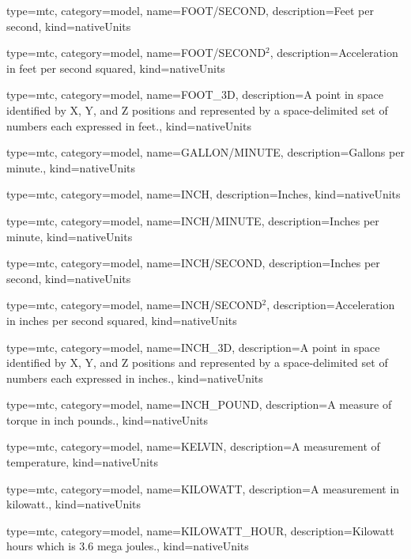 {
  type=mtc,
  category=model,
  name={FOOT/SECOND},
  description={Feet per second},
  kind={nativeUnits}
}


{
  type=mtc,
  category=model,
  name={FOOT/SECOND$^2$},
  description={Acceleration in feet per second squared},
  kind={nativeUnits}
}


{
  type=mtc,
  category=model,
  name={FOOT\_3D},
  description={A point in space identified by X, Y, and Z positions and represented by a space-delimited set of numbers each expressed in feet.},
  kind={nativeUnits}
}


{
  type=mtc,
  category=model,
  name={GALLON/MINUTE},
  description={Gallons per minute.},
  kind={nativeUnits}
}


{
  type=mtc,
  category=model,
  name={INCH},
  description={Inches},
  kind={nativeUnits}
}


{
  type=mtc,
  category=model,
  name={INCH/MINUTE},
  description={Inches per minute},
  kind={nativeUnits}
}


{
  type=mtc,
  category=model,
  name={INCH/SECOND},
  description={Inches per second},
  kind={nativeUnits}
}


{
  type=mtc,
  category=model,
  name={INCH/SECOND$^2$},
  description={Acceleration in inches per second squared},
  kind={nativeUnits}
}


{
  type=mtc,
  category=model,
  name={INCH\_3D},
  description={A point in space identified by X, Y, and Z positions and represented by a space-delimited set of numbers each expressed in inches.},
  kind={nativeUnits}
}


{
  type=mtc,
  category=model,
  name={INCH\_POUND},
  description={A measure of torque in inch pounds.},
  kind={nativeUnits}
}


{
  type=mtc,
  category=model,
  name={KELVIN},
  description={A measurement of temperature},
  kind={nativeUnits}
}


{
  type=mtc,
  category=model,
  name={KILOWATT},
  description={A measurement in kilowatt.},
  kind={nativeUnits}
}


{
  type=mtc,
  category=model,
  name={KILOWATT\_HOUR},
  description={Kilowatt hours which is 3.6 mega joules.},
  kind={nativeUnits}
}


